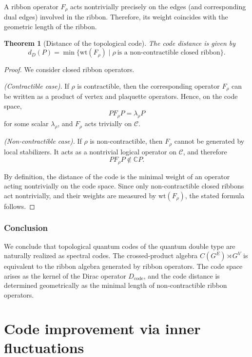 \documentclass[12pt]{article}
\theoremstyle{definition} %
\theoremstyle{plain} %
\newtheorem{theorem}{Theorem}[section]
\theoremstyle{remark} %
\theoremstyle{underline}
\begin{document}
A ribbon operator $F_\rho$ acts nontrivially precisely on the edges (and corresponding dual edges) involved in the ribbon.
Therefore, its weight coincides with the geometric length of the ribbon.

\begin{theorem}[Distance of the topological code]
The code distance is given by
\[
    d_D(P)
    =
    \min\{\mathrm{wt}(F_\rho)\mid
    \rho\ \text{is a non-contractible closed ribbon}\}.
\]
\end{theorem}

\begin{proof}
We consider closed ribbon operators.

\emph{(Contractible case).}
If $\rho$ is contractible, then the corresponding operator $F_\rho$ can be written as a product of vertex and plaquette operators.
Hence, on the code space,
\[
    P F_\rho P = \lambda_\rho P
\]
for some scalar $\lambda_\rho$, and $F_\rho$ acts trivially on $\mathcal C$.

\emph{(Non-contractible case).}
If $\rho$ is non-contractible, then $F_\rho$ cannot be generated by local stabilizers.
It acts as a nontrivial logical operator on $\mathcal C$, and therefore
\[
    P F_\rho P \notin \mathbb{C}P.
\]

By definition, the distance of the code is the minimal weight of an operator acting nontrivially on the code space.
Since only non-contractible closed ribbons act nontrivially, and their weights are measured by $\mathrm{wt}(F_\rho)$, the stated formula follows.
\end{proof}

\subsubsection*{Conclusion}

We conclude that topological quantum codes of the quantum double type are naturally realized as spectral codes.
The crossed-product algebra $C(G^{E})\rtimes G^{V}$ is equivalent to the ribbon algebra generated by ribbon operators.
The code space arises as the kernel of the Dirac operator $D_{\mathrm{code}}$, and the code distance is determined geometrically as the minimal length of non-contractible ribbon operators.


\section{Code improvement via inner fluctuations}
\end{document}
